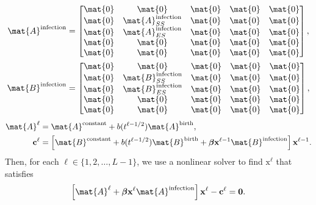 \documentclass{jpmarticle}
\renewcommand{\vec}[1]{\boldsymbol{\mathrm{#1}}}
\begin{document}
\begin{equation}
  \begin{split}
    \mat{A}^{\text{infection}} &=
    \begin{bmatrix}
      \mat{0} & \mat{0} & \mat{0} & \mat{0} & \mat{0}
      \\
      \mat{0} & \mat{A}_{SS}^{\text{infection}} & \mat{0} & \mat{0} & \mat{0}
      \\
      \mat{0} & \mat{A}_{ES}^{\text{infection}} & \mat{0} & \mat{0} & \mat{0}
      \\
      \mat{0} & \mat{0} & \mat{0} & \mat{0} & \mat{0}
      \\
      \mat{0} & \mat{0} & \mat{0} & \mat{0} & \mat{0}
    \end{bmatrix},
    \\
    \mat{B}^{\text{infection}} &=
    \begin{bmatrix}
      \mat{0} & \mat{0} & \mat{0} & \mat{0} & \mat{0}
      \\
      \mat{0} & \mat{B}_{SS}^{\text{infection}} & \mat{0} & \mat{0} & \mat{0}
      \\
      \mat{0} & \mat{B}_{ES}^{\text{infection}} & \mat{0} & \mat{0} & \mat{0}
      \\
      \mat{0} & \mat{0} & \mat{0} & \mat{0} & \mat{0}
      \\
      \mat{0} & \mat{0} & \mat{0} & \mat{0} & \mat{0}
    \end{bmatrix},
  \end{split}
\end{equation}
\begin{equation}
  \begin{split}
    \mat{A}^{\ell} &=
    \mat{A}^{\text{constant}}
    + b(t^{\ell - 1 / 2}) \mat{A}^{\text{birth}},
    \\
    \vec{c}^{\ell} &=
    \left[
      \mat{B}^{\text{constant}}
      + b(t^{\ell - 1 / 2}) \mat{B}^{\text{birth}}
      + \vec{\beta} \vec{x}^{\ell - 1} \mat{B}^{\text{infection}}
    \right] \vec{x}^{\ell - 1}.
  \end{split}
\end{equation}
Then, for each $\ell \in \{1, 2, \ldots, L - 1\}$,
we use a nonlinear solver to find $\vec{x}^{\ell}$ that satisfies
\begin{equation}
  \left[
    \mat{A}^{\ell}
    + \vec{\beta} \vec{x}^{\ell} \mat{A}^{\text{infection}}
  \right] \vec{x}^{\ell}
  - \vec{c}^{\ell}
  = \vec{0}.
\end{equation}
\end{document}
